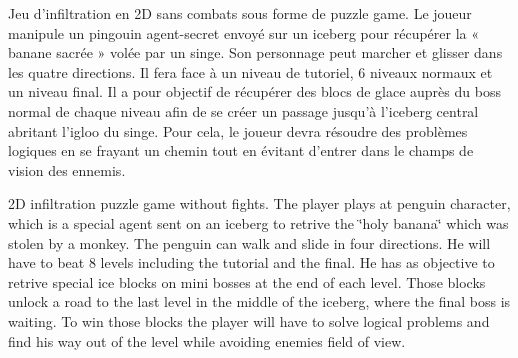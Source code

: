 Jeu d’infiltration en 2\+D sans combats sous forme de puzzle game. Le joueur manipule un pingouin agent-\/secret envoyé sur un iceberg pour récupérer la « banane sacrée » volée par un singe. Son personnage peut marcher et glisser dans les quatre directions. Il fera face à un niveau de tutoriel, 6 niveaux normaux et un niveau final. Il a pour objectif de récupérer des blocs de glace auprès du boss normal de chaque niveau afin de se créer un passage jusqu’à l’iceberg central abritant l’igloo du singe. Pour cela, le joueur devra résoudre des problèmes logiques en se frayant un chemin tout en évitant d’entrer dans le champs de vision des ennemis.

2\+D infiltration puzzle game without fights. The player plays at penguin character, which is a special agent sent on an iceberg to retrive the \char`\"{}holy banana\char`\"{} which was stolen by a monkey. The penguin can walk and slide in four directions. He will have to beat 8 levels including the tutorial and the final. He has as objective to retrive special ice blocks on mini bosses at the end of each level. Those blocks unlock a road to the last level in the middle of the iceberg, where the final boss is waiting. To win those blocks the player will have to solve logical problems and find his way out of the level while avoiding enemies\textquotesingle{} field of view. 

~\newline
 